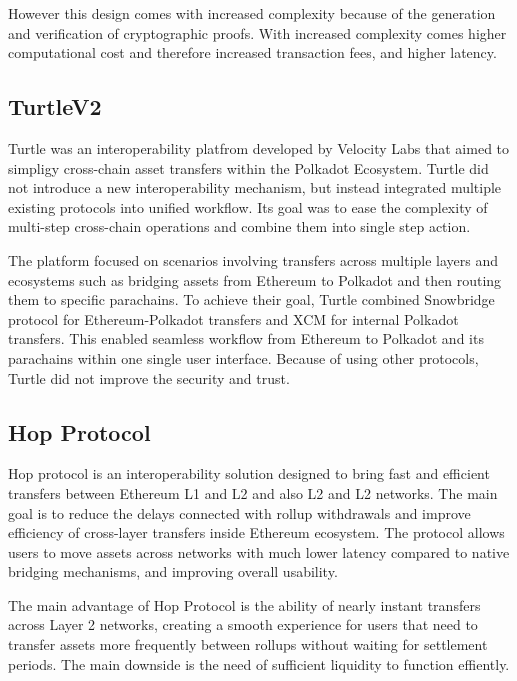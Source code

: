 \documentclass[conference]{IEEEtran}
\begin{document}
However this design comes with increased complexity because of the generation and verification of cryptographic proofs. With increased complexity comes higher computational cost and therefore increased transaction fees, and higher latency.



\subsection{TurtleV2}

Turtle was an interoperability platfrom developed by Velocity Labs that aimed to simpligy cross-chain asset transfers within the Polkadot Ecosystem. Turtle did not introduce a new interoperability mechanism, but instead integrated multiple existing protocols into unified workflow. Its goal was to ease the complexity of multi-step cross-chain operations and combine them into single step action.

The platform focused on scenarios involving transfers across multiple layers and ecosystems such as bridging assets from Ethereum to Polkadot and then routing them to specific parachains. To achieve their goal, Turtle combined  Snowbridge protocol for Ethereum-Polkadot transfers and XCM for internal Polkadot transfers. This enabled seamless workflow from Ethereum to Polkadot and its parachains within one single user interface.
Because of using other protocols, Turtle did not improve the security and trust.


\subsection{Hop Protocol}

Hop protocol is an interoperability solution designed to bring fast and efficient transfers between Ethereum L1 and L2 and also L2 and L2 networks. The main goal is to reduce the delays connected with rollup withdrawals and improve efficiency of cross-layer transfers inside Ethereum ecosystem. The protocol allows users to move assets across networks with much lower latency compared to native bridging mechanisms, and improving overall usability.\cite{hop2021}

The main advantage of Hop Protocol is the ability of nearly instant transfers across Layer 2 networks, creating a smooth experience for users that need to transfer assets more frequently  between rollups without waiting for settlement periods. The main downside is the need of sufficient liquidity to function effiently.\cite{hop2021}
\end{document}
